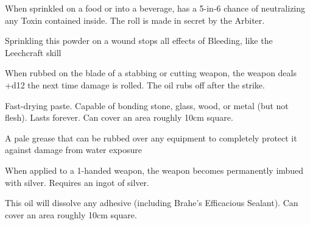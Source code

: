 {  \CHYMISTRY[
    Name=Powdered Bezoar,
    Link=chymistry-powdered-bezoar,
    Cost=Iron (1),
    Duration=0 ,
    Toxin=No,
    Narcotic=No 
  ]


  When sprinkled on a food or into a beverage, has a 5-in-6 chance of neutralizing any Toxin contained inside.  The roll is made in secret by the Arbiter.


  \CHYMISTRY[
    Name=Woundseal,
    Link=chymistry-woundseal,
    Cost=Iron (1),
    Duration=0 ,
    Toxin=No,
    Narcotic=No 
  ]


  Sprinkling this powder on a wound stops all effects of Bleeding, like the Leechcraft skill 



  \CHYMISTRY[
    Name=Boyle's Sharpening Paste,
    Link=chymistry-boyles-sharpening-paste,
    Cost=Iron (1),
    Duration=0 ,
    Toxin=No,
    Narcotic=No 
  ]
  When rubbed on the blade of a stabbing or cutting weapon, the weapon deals +d12 the next time damage is rolled.  The oil rubs off after the strike.


  \CHYMISTRY[
    Name=Brahe's Efficacious Sealant,
    Link=chymistry-brahes-efficacious-sealant,
    Cost=Gold (5),
    Duration=0 ,
    Toxin=No,
    Narcotic=No 
  ]
  Fast-drying paste. Capable of bonding stone, glass, wood, or metal (but not flesh). Lasts forever.  Can cover an area roughly 10cm square.


  \CHYMISTRY[
    Name=Faivre's Aqua Grease,
    Link=chymistry-faivres-aqua-grease,
    Cost=Iron (1),
    Duration=0 ,
    Toxin=No,
    Narcotic=No 
  ]
  A pale grease that can be rubbed over any equipment to completely protect it against damage from water exposure

  \CHYMISTRY[
    Name=Tesla's Silver Wash,
    Link=chymistry-teslas-silver-wash,
    Cost=Silver (3),
    Duration=0 ,
    Toxin=No,
    Narcotic=No 
  ]
  When applied to a 1-handed weapon, the weapon becomes permanently imbued with silver.  Requires an ingot of silver.

  \CHYMISTRY[
    Name=Wei Boyang's Alkahest,
    Link=chymistry-wei-boyangs-alkahest,
    Cost=Gold (5),
    Duration=0 ,
    Toxin=No,
    Narcotic=No 
  ]

  This oil will dissolve any adhesive (including Brahe's Efficacious Sealant).  Can cover an area roughly 10cm square.



}
